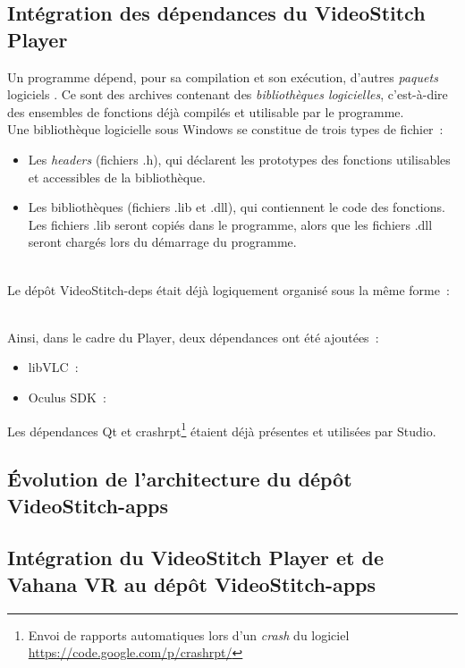 \subsection{Intégration des dépendances du VideoStitch Player}
\label{integration-dependances-player}
Un programme dépend, pour sa compilation et son exécution, d'autres \emph{paquets} logiciels
\cite{dependance-logicielle}. Ce sont des archives contenant des \emph{bibliothèques logicielles},
c'est-à-dire des ensembles de fonctions déjà compilés et utilisable par le programme.\\
Une bibliothèque logicielle sous Windows se constitue de trois types de fichier\cite{bibliotheque-logicielle}~:
\begin{itemize}
  \item Les \textit{headers} (fichiers .h), qui déclarent les prototypes des fonctions utilisables
  et accessibles de la bibliothèque.
  \item Les bibliothèques (fichiers .lib et .dll), qui contiennent le code des fonctions.
  Les fichiers .lib seront copiés dans le programme, alors que les fichiers .dll seront
  chargés lors du démarrage du programme\cite{bibliotheque-logicielle}.
\end{itemize}
\ \\
\newline
Le dépôt VideoStitch-deps était déjà logiquement organisé sous la même forme~:

\ \\
\newline
Ainsi, dans le cadre du Player, deux dépendances ont été ajoutées~:
\begin{itemize}
  \item libVLC~:
  \item Oculus SDK~:
\end{itemize}
Les dépendances Qt et crashrpt\footnote{Envoi de rapports automatiques lors d'un
\textit{crash} du logiciel \url{https://code.google.com/p/crashrpt/}} étaient déjà 
présentes et utilisées par Studio.

\subsection{Évolution de l'architecture du dépôt VideoStitch-apps}

\subsection{Intégration du VideoStitch Player et de Vahana VR au dépôt VideoStitch-apps}

